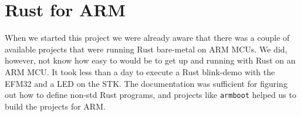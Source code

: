 
\section{Rust for ARM} %
\label{sec:rust_for_arm}

When we started this project we were already aware that there was a couple of available projects that were running Rust bare-metal on ARM MCUs.
We did, however, not know how easy to would be to get up and running with Rust on an ARM MCU.
It took less than a day to execute a Rust blink-demo with the EFM32 and a LED on the STK.
The documentation was sufficient for figuring out how to define non-std Rust programs, and projects like \texttt{armboot} helped us to build the projects for ARM.